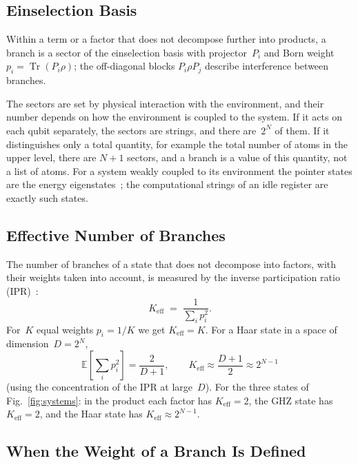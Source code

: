 \documentclass[11pt,a4paper]{article}
\DeclareMathOperator{\Tr}{Tr}
\newcommand{\Keff}{K_{\mathrm{eff}}}
\begin{document}
\subsection{Einselection Basis}
\label{sec:pointer}

Within a term or a factor that does not decompose further into products, a branch is a sector of the einselection basis with projector~$P_i$ and Born weight $p_i=\Tr(P_i\rho)$; the off-diagonal blocks $P_i\rho P_j$ describe interference between branches.

The sectors are set by physical interaction with the environment, and their number depends on how the environment is coupled to the system. If it acts on each qubit separately, the sectors are strings, and there are~$2^N$ of them. If it distinguishes only a total quantity, for example the total number of atoms in the upper level, there are $N+1$ sectors, and a branch is a value of this quantity, not a list of atoms. For a system weakly coupled to its environment the pointer states are the energy eigenstates~\cite{pazzurek1999}; the computational strings of an idle register are exactly such states.

\subsection{Effective Number of Branches}
\label{sec:keff}

The number of branches of a state that does not decompose into factors, with their weights taken into account, is measured by the inverse participation ratio (IPR)~\cite{thouless1974,grobe1994}:
\begin{equation}
\Keff \;=\; \frac{1}{\sum_i p_i^2}.
\end{equation}
For~$K$ equal weights $p_i=1/K$ we get $\Keff=K$. For a Haar state in a space of dimension~$D=2^N$,
\begin{equation}
\mathbb E\!\left[\sum_i p_i^2\right]=\frac{2}{D+1},
\qquad
\Keff\approx\frac{D+1}{2}\approx2^{N-1}
\end{equation}
(using the concentration of the IPR at large~$D$). For the three states of Fig.~\ref{fig:systems}: in the product each factor has $\Keff=2$, the GHZ state has $\Keff=2$, and the Haar state has $\Keff\approx2^{N-1}$.

\subsection{When the Weight of a Branch Is Defined}
\label{sec:weight}
\end{document}
